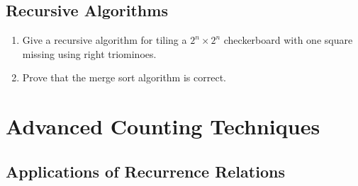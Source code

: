\documentclass{../../cls/sig-alternate-05-2015}
\begin{document}
\subsection{Recursive Algorithms}
\begin{enumerate}
\item Give a recursive algorithm for tiling a $2^n \times 2^n$ checkerboard with one square missing using right triominoes.

\item Prove that the merge sort algorithm is correct.
\end{enumerate}

\section{Advanced Counting Techniques}
\subsection{Applications of Recurrence Relations}
\end{document}
